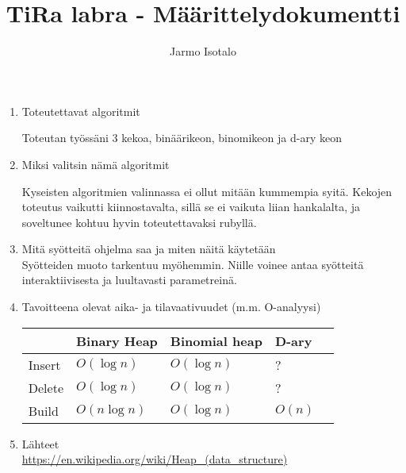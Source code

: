 \documentclass[a4paper,12pt]{article}
\begin{document}
\title{TiRa labra - Määrittelydokumentti} 
\author{Jarmo Isotalo}
\maketitle
\begin{enumerate}
\item Toteutettavat algoritmit

Toteutan työssäni 3 kekoa, binäärikeon, binomikeon ja d-ary keon

\item Miksi valitsin nämä algoritmit

Kyseisten algoritmien valinnassa ei ollut mitään kummempia syitä. Kekojen toteutus vaikutti
kiinnostavalta, sillä se ei vaikuta liian hankalalta, ja soveltunee kohtuu hyvin toteutettavaksi rubyllä.

\item Mitä syötteitä ohjelma saa ja miten näitä käytetään\\
Syötteiden muoto tarkentuu myöhemmin. 
Niille voinee antaa syötteitä interaktiivisesta ja luultavasti parametreinä.

\item Tavoitteena olevat aika- ja tilavaativuudet (m.m. O-analyysi)

\begin{tabular}{|l|l|l|l|l|}
\hline
&Binary Heap & Binomial heap & D-ary \\\hline
Insert & $O (\log n)$ & $O (\log n)$ & ?\\\hline
Delete  & $O (\log n)$ & $O (\log n)$ & ?\\\hline
Build & $O (n \log n)$ & $O (\log n)$ & $O (n)$\\\hline
\end{tabular}


\item Lähteet\\
\url{https://en.wikipedia.org/wiki/Heap_(data_structure)}
\end{enumerate}
\end{document}
